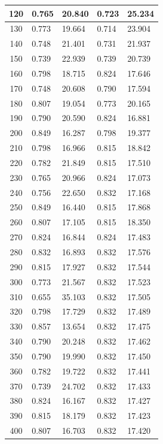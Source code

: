 \documentclass{report}
\begin{document}
\begin{minipage}{\textwidth}
\begin{longtable}{|c|l|l|l|l|}
                     120 & 0.765 & 20.840 & 0.723 & 25.234 \\ \hline
                     130 & 0.773 & 19.664 & 0.714 & 23.904 \\ \hline
                     140 & 0.748 & 21.401 & 0.731 & 21.937 \\ \hline
                     150 & 0.739 & 22.939 & 0.739 & 20.739 \\ \hline
                     160 & 0.798 & 18.715 & 0.824 & 17.646 \\ \hline
                     170 & 0.748 & 20.608 & 0.790 & 17.594 \\ \hline
                     180 & 0.807 & 19.054 & 0.773 & 20.165 \\ \hline
                     190 & 0.790 & 20.590 & 0.824 & 16.881 \\ \hline
                     200 & 0.849 & 16.287 & 0.798 & 19.377 \\ \hline
                     210 & 0.798 & 16.966 & 0.815 & 18.842 \\ \hline
                     220 & 0.782 & 21.849 & 0.815 & 17.510 \\ \hline
                     230 & 0.765 & 20.966 & 0.824 & 17.073 \\ \hline
                     240 & 0.756 & 22.650 & 0.832 & 17.168 \\ \hline
                     250 & 0.849 & 16.440 & 0.815 & 17.868 \\ \hline
                     260 & 0.807 & 17.105 & 0.815 & 18.350 \\ \hline
                     270 & 0.824 & 16.844 & 0.824 & 17.483 \\ \hline
                     280 & 0.832 & 16.893 & 0.832 & 17.576 \\ \hline
                     290 & 0.815 & 17.927 & 0.832 & 17.544 \\ \hline
                     300 & 0.773 & 21.567 & 0.832 & 17.523 \\ \hline
                     310 & 0.655 & 35.103 & 0.832 & 17.505 \\ \hline
                     320 & 0.798 & 17.729 & 0.832 & 17.489 \\ \hline
                     330 & 0.857 & 13.654 & 0.832 & 17.475 \\ \hline
                     340 & 0.790 & 20.248 & 0.832 & 17.462 \\ \hline
                     350 & 0.790 & 19.990 & 0.832 & 17.450 \\ \hline
                     360 & 0.782 & 19.722 & 0.832 & 17.441 \\ \hline
                     370 & 0.739 & 24.702 & 0.832 & 17.433 \\ \hline
                     380 & 0.824 & 16.167 & 0.832 & 17.427 \\ \hline
                     390 & 0.815 & 18.179 & 0.832 & 17.423 \\ \hline
                     400 & 0.807 & 16.703 & 0.832 & 17.420 \\ \hline
                 \end{longtable}
    \end{minipage}
\end{document}
